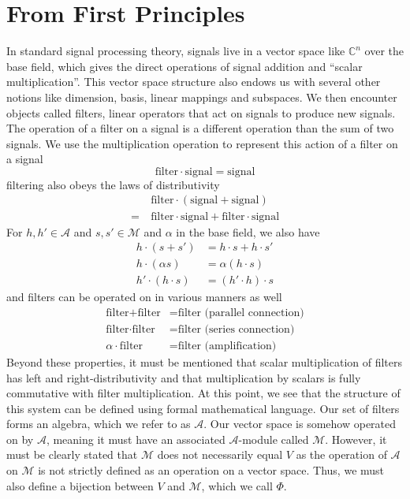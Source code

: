 \documentclass[12pt,technote]{IEEEtran}
\begin{document}
\section{From First Principles}
In standard signal processing theory, signals live in a vector space like $\mathbb{C}^n$ over the base field, which gives the direct operations of signal addition and ``scalar multiplication''. This vector space structure also endows us with several other notions like dimension, basis, linear mappings and subspaces. We then encounter objects called filters, linear operators that act on signals to produce new signals. The operation of a filter on a signal is a different operation than the sum of two signals. We use the multiplication operation to represent this action of a filter on a signal
\begin{equation*}
    \text{filter}\cdot\text{signal} = \text{signal}
\end{equation*}
filtering also obeys the laws of distributivity
\begin{align*}
    &\text{filter}\cdot (\text{signal} + \text{signal}) \\
    =\ &\text{filter}\cdot \text{signal} + \text{filter}\cdot\text{signal}
\end{align*}
For $h,h'\in \mathcal{A}$ and $s,s'\in\mathcal{M}$ and $\alpha$ in the base field, we also have 
\begin{align*}
    h\cdot (s + s') &= h\cdot s + h\cdot s'\\
    h\cdot (\alpha s) &= \alpha (h\cdot s)\\
    h'\cdot (h\cdot s) &= (h'\cdot h)\cdot s
\end{align*}
and filters can be operated on in various manners as well
\begin{align*}
    \text{filter} + \text{filter} &= \text{filter (parallel connection)}\\
    \text{filter} \cdot \text{filter} &= \text{filter (series connection)}\\
    \alpha\cdot\text{filter} &= \text{filter (amplification)}
\end{align*}
Beyond these properties, it must be mentioned that scalar multiplication of filters has left and right-distributivity and that multiplication by scalars is fully commutative with filter multiplication.
At this point, we see that the structure of this system can be defined using formal mathematical language. Our set of filters forms an algebra, which we refer to as $\mathcal{A}$. Our vector space is somehow operated on by $\mathcal{A}$, meaning it must have an associated $\mathcal{A}$-module called $\mathcal{M}$. However, it must be clearly stated that $\mathcal{M}$ does not necessarily equal $V$ as the operation of $\mathcal{A}$ on $\mathcal{M}$ is not strictly defined as an operation on a vector space. Thus, we must also define a bijection between $V$ and $\mathcal{M}$, which we call $\Phi$.
\end{document}
